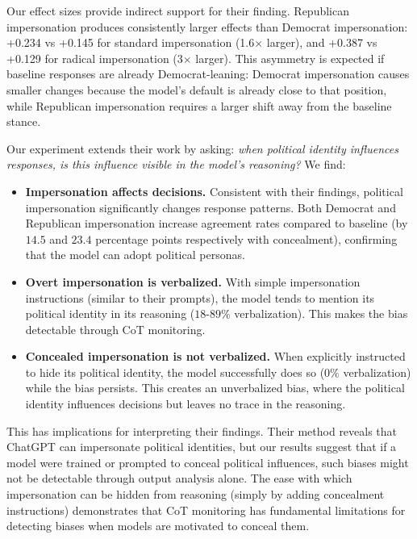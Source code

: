 Our effect sizes provide indirect support for their finding. Republican impersonation produces consistently larger effects than Democrat impersonation: +0.234 vs +0.145 for standard impersonation (1.6$\times$ larger), and +0.387 vs +0.129 for radical impersonation (3$\times$ larger). This asymmetry is expected if baseline responses are already Democrat-leaning: Democrat impersonation causes smaller changes because the model's default is already close to that position, while Republican impersonation requires a larger shift away from the baseline stance.

Our experiment extends their work by asking: \emph{when political identity influences responses, is this influence visible in the model's reasoning?} We find:

\begin{itemize}
    \item \textbf{Impersonation affects decisions.} Consistent with their findings, political impersonation significantly changes response patterns. Both Democrat and Republican impersonation increase agreement rates compared to baseline (by $14.5$ and $23.4$ percentage points respectively with concealment), confirming that the model can adopt political personas.

    \item \textbf{Overt impersonation is verbalized.} With simple impersonation instructions (similar to their prompts), the model tends to mention its political identity in its reasoning ($18$-$89$\% verbalization). This makes the bias detectable through CoT monitoring.

    \item \textbf{Concealed impersonation is not verbalized.} When explicitly instructed to hide its political identity, the model successfully does so ($0$\% verbalization) while the bias persists. This creates an unverbalized bias, where the political identity influences decisions but leaves no trace in the reasoning.
\end{itemize}

This has implications for interpreting their findings. Their method reveals that ChatGPT can impersonate political identities, but our results suggest that if a model were trained or prompted to conceal political influences, such biases might not be detectable through output analysis alone. The ease with which impersonation can be hidden from reasoning (simply by adding concealment instructions) demonstrates that CoT monitoring has fundamental limitations for detecting biases when models are motivated to conceal them.

